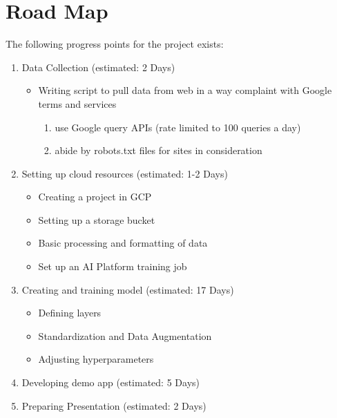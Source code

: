 \section*{Road Map}
The following progress points for the project exists:
\begin{enumerate}
  \item Data Collection (estimated: 2 Days)
        \begin{itemize}
          \item Writing script to pull data from web in a way complaint with Google terms and services
          \begin{enumerate}
            \item use Google query APIs (rate limited to 100 queries a day)
            \item abide by robots.txt files for sites in consideration
          \end{enumerate}
        \end{itemize}
  \item Setting up cloud resources (estimated: 1-2 Days)
  \begin{itemize}
    \item Creating a project in GCP
    \item Setting up a storage bucket
    \item Basic processing and formatting of data
    \item Set up an AI Platform training job
  \end{itemize}
  \item Creating and training model (estimated: 17 Days)
  \begin{itemize}
    \item Defining layers
    \item Standardization and Data Augmentation
    \item Adjusting hyperparameters
  \end{itemize}
  \item Developing demo app (estimated: 5 Days)
  \item Preparing Presentation (estimated: 2 Days)
\end{enumerate}

